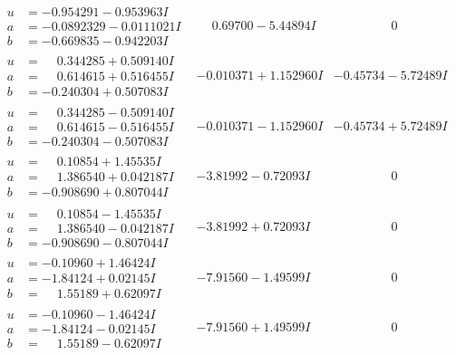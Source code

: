 \documentclass[1p]{elsarticle_modified}
\theoremstyle{definition}
\begin{document}
$$\begin{array}{c|c|c}
\begin{aligned}
u &= -0.954291 - 0.953963 I \\
a &= -0.0892329 - 0.0111021 I \\
b &= -0.669835 - 0.942203 I\end{aligned}
 & \phantom{-}0.69700 - 5.44894 I & \phantom{-0.000000 } 0 \\ \hline\begin{aligned}
u &= \phantom{-}0.344285 + 0.509140 I \\
a &= \phantom{-}0.614615 + 0.516455 I \\
b &= -0.240304 + 0.507083 I\end{aligned}
 & -0.010371 + 1.152960 I & -0.45734 - 5.72489 I \\ \hline\begin{aligned}
u &= \phantom{-}0.344285 - 0.509140 I \\
a &= \phantom{-}0.614615 - 0.516455 I \\
b &= -0.240304 - 0.507083 I\end{aligned}
 & -0.010371 - 1.152960 I & -0.45734 + 5.72489 I \\ \hline\begin{aligned}
u &= \phantom{-}0.10854 + 1.45535 I \\
a &= \phantom{-}1.386540 + 0.042187 I \\
b &= -0.908690 + 0.807044 I\end{aligned}
 & -3.81992 - 0.72093 I & \phantom{-0.000000 } 0 \\ \hline\begin{aligned}
u &= \phantom{-}0.10854 - 1.45535 I \\
a &= \phantom{-}1.386540 - 0.042187 I \\
b &= -0.908690 - 0.807044 I\end{aligned}
 & -3.81992 + 0.72093 I & \phantom{-0.000000 } 0 \\ \hline\begin{aligned}
u &= -0.10960 + 1.46424 I \\
a &= -1.84124 + 0.02145 I \\
b &= \phantom{-}1.55189 + 0.62097 I\end{aligned}
 & -7.91560 - 1.49599 I & \phantom{-0.000000 } 0 \\ \hline\begin{aligned}
u &= -0.10960 - 1.46424 I \\
a &= -1.84124 - 0.02145 I \\
b &= \phantom{-}1.55189 - 0.62097 I\end{aligned}
 & -7.91560 + 1.49599 I & \phantom{-0.000000 } 0\\

\end{array}$$
\end{document}
